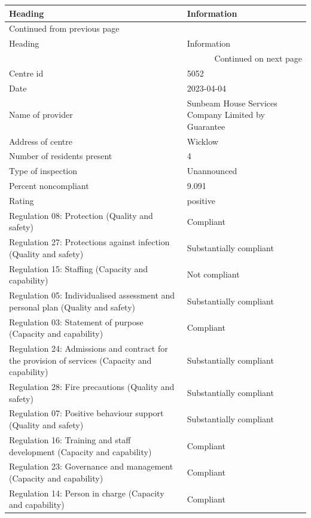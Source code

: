 \documentclass[a4paper,11pt,twoside]{article}
\begin{document}
\begin{longtable}{p{11cm}|p{5cm}}
Heading & Information\\[0pt]
\hline
\endfirsthead
\multicolumn{2}{l}{Continued from previous page} \\[0pt]
\hline

Heading & Information \\[0pt]

\hline
\endhead
\hline\multicolumn{2}{r}{Continued on next page} \\
\endfoot
\endlastfoot
\hline
Centre id & 5052\\[0pt]
Date & 2023-04-04\\[0pt]
Name of provider & Sunbeam House Services Company Limited by Guarantee\\[0pt]
Address of centre & Wicklow\\[0pt]
Number of residents present & 4\\[0pt]
Type of inspection & Unannounced\\[0pt]
Percent noncompliant & 9.091\\[0pt]
Rating & positive\\[0pt]
Regulation 08: Protection (Quality and safety) & Compliant\\[0pt]
Regulation 27: Protections against infection (Quality and safety) & Substantially compliant\\[0pt]
Regulation 15: Staffing (Capacity and capability) & Not compliant\\[0pt]
Regulation 05: Individualised assessment and personal plan (Quality and safety) & Substantially compliant\\[0pt]
Regulation 03: Statement of purpose (Capacity and capability) & Compliant\\[0pt]
Regulation 24: Admissions and contract for the provision of services (Capacity and capability) & Substantially compliant\\[0pt]
Regulation 28: Fire precautions (Quality and safety) & Substantially compliant\\[0pt]
Regulation 07: Positive behaviour support (Quality and safety) & Substantially compliant\\[0pt]
Regulation 16: Training and staff development (Capacity and capability) & Compliant\\[0pt]
Regulation 23: Governance and management (Capacity and capability) & Compliant\\[0pt]
Regulation 14: Person in charge (Capacity and capability) & Compliant\\[0pt]
\end{longtable}
\end{document}
